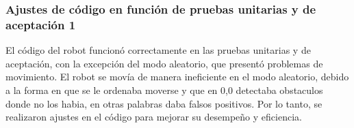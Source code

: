 \subsubsection{Ajustes de c\'odigo en funci\'on de pruebas unitarias y de aceptaci\'on 1}
\label{subsub:Ajustes de c\'odigo en funci\'on de pruebas unitarias y de aceptaci\'on}
    El c\'odigo del robot funcion\'o correctamente en las pruebas unitarias y de aceptaci\'on, 
    con la excepci\'on del modo aleatorio, que present\'o problemas de movimiento.
    El robot se mov\'ia de manera ineficiente en el modo aleatorio, debido a la forma en 
    que se le ordenaba moverse y que en 0,0 detectaba obstaculos donde no los habia, en otras palabras daba 
    falsos positivos. Por lo tanto, se realizaron ajustes en el c\'odigo para 
    mejorar su desempe\~no y eficiencia.

